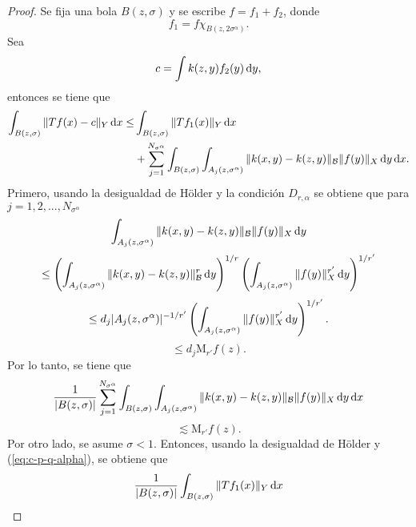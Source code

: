 \begin{proof}
	Se fija una bola $B(z, \sigma)$ y se escribe $f=f_1+f_2$, donde 
	\begin{equation*}
		f_1 = f\chi_{B(z, 2\sigma^\alpha)}.
	\end{equation*}
	Sea
	\begin{equation*}
		c = \int k(z, y)f_2(y)\mathop{}\!\mathrm{d} y,
	\end{equation*}
	entonces se tiene que
	\begin{align*}
		\int_{B(z, \sigma)} \|Tf(x)-c\|_Y \mathop{}\!\mathrm{d} x \leq & \int_{B(z, \sigma)} \|Tf_1(x)\|_Y \mathop{}\!\mathrm{d} x \\
		& + \sum_{j=1}^{N_{\sigma^\alpha}} \int_{B(z, \sigma)}\int_{A_j(z, \sigma^\alpha)} \|k(x,y)-k(z,y)\|_\mathcal{B}\|f(y)\|_X \mathop{}\!\mathrm{d} y \mathop{}\!\mathrm{d} x .
	\end{align*}
	Primero, usando la desigualdad de H\"older y la condición $D_{r, \alpha}$ se obtiene que para $j=1,2,...,N_{\sigma^\alpha}$
	\begin{equation*}
		\int_{A_j(z, \sigma^\alpha)} \|k(x,y)-k(z,y)\|_\mathcal{B}\|f(y)\|_X \mathop{}\!\mathrm{d} y 
	\end{equation*}
	\begin{equation*}
		\leq\left( \int_{A_j(z, \sigma^\alpha)} \|k(x,y)-k(z,y)\|_\mathcal{B}^r \mathop{}\!\mathrm{d} y \right)^{1/r}\left(  \int_{A_j(z,\sigma^\alpha)}  \|f(y)\|_X^{r'} \mathop{}\!\mathrm{d} y \right)^{1/r'}
	\end{equation*}
	\begin{equation*}
		\leq  d_j |A_j(z,\sigma^\alpha)|^{-1/r'}\left(  \int_{A_j(z,\sigma^\alpha)}  \|f(y)\|_X^{r'} \mathop{}\!\mathrm{d} y \right)^{1/r'}.
	\end{equation*}
	\begin{equation*}
		\leq d_j \mathrm{M}_{r'}f(z).
	\end{equation*}
	Por lo tanto, se tiene que 
	\begin{equation*}
		\frac{1}{|B(z,\sigma)|}\sum_{j=1}^{N_{\sigma^\alpha}} \int_{B(z,\sigma)}\int_{A_j(z, \sigma^\alpha)} \|k(x,y)-k(z,y)\|_\mathcal{B}\|f(y)\|_X \mathop{}\!\mathrm{d} y \mathop{}\!\mathrm{d} x
	\end{equation*}
	\begin{equation*}
		\lesssim \mathrm{M}_{r'}f(z).
	\end{equation*}
	Por otro lado, se asume $\sigma<1$. Entonces, usando la desigualdad de H\"older y (\ref{eq:c-p-q-alpha}), se obtiene que
	\begin{equation*}
		\frac{1}{|B(z,\sigma)|}\int_{B(z, \sigma)}\|Tf_1(x)\|_Y \mathop{}\!\mathrm{d} x 
	\end{equation*}
	\begin{equation*}

\end{equation*}
\end{proof}
